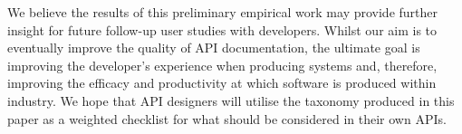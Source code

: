 We believe the results of this preliminary empirical work may provide further insight for future follow-up user studies with developers. Whilst our aim is to eventually improve the quality of API documentation, the ultimate goal is  improving the developer's experience when producing systems and, therefore, improving the efficacy and productivity at which software is produced within industry.   We hope that API designers will utilise the taxonomy produced in this paper as a weighted checklist for what should be considered in their own APIs.
